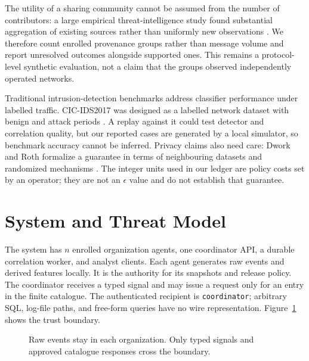 \documentclass[conference,letterpaper]{IEEEtran}
\begin{document}
The utility of a sharing community cannot be assumed from the number of contributors: a large empirical threat-intelligence study found substantial aggregation of existing sources rather than uniformly new observations \cite{bouwman}. We therefore count enrolled provenance groups rather than message volume and report unresolved outcomes alongside supported ones. This remains a protocol-level synthetic evaluation, not a claim that the groups observed independently operated networks.

Traditional intrusion-detection benchmarks address classifier performance under labelled traffic. CIC-IDS2017 was designed as a labelled network dataset with benign and attack periods \cite{cicpaper,cicdata}. A replay against it could test detector and correlation quality, but our reported cases are generated by a local simulator, so benchmark accuracy cannot be inferred. Privacy claims also need care: Dwork and Roth formalize a guarantee in terms of neighbouring datasets and randomized mechanisms \cite{dwork}. The integer units used in our ledger are policy costs set by an operator; they are not an $\epsilon$ value and do not establish that guarantee.

\section{System and Threat Model}
The system has $n$ enrolled organization agents, one coordinator API, a durable correlation worker, and analyst clients. Each agent generates raw events and derived features locally. It is the authority for its snapshots and release policy. The coordinator receives a typed signal and may issue a request only for an entry in the finite catalogue. The authenticated recipient is \texttt{coordinator}; arbitrary SQL, log-file paths, and free-form queries have no wire representation. Figure~\ref{fig:flow} shows the trust boundary.

\begin{figure}[t]
\centering
{}
\caption{Raw events stay in each organization. Only typed signals and approved catalogue responses cross the boundary.}
\label{fig:flow}
\end{figure}
\end{document}
